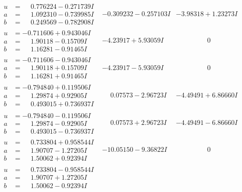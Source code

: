 \documentclass[1p]{elsarticle_modified}
\theoremstyle{definition}
\begin{document}
$$\begin{array}{c|c|c}
\begin{aligned}
u &= \phantom{-}0.776224 - 0.271739 I \\
a &= \phantom{-}1.092310 - 0.739985 I \\
b &= \phantom{-}0.249569 - 0.782908 I\end{aligned}
 & -0.309232 - 0.257103 I & -3.98318 + 1.23273 I \\ \hline\begin{aligned}
u &= -0.711606 + 0.943046 I \\
a &= \phantom{-}1.90118 - 0.15709 I \\
b &= \phantom{-}1.16281 - 0.91465 I\end{aligned}
 & -4.23917 + 5.93059 I & \phantom{-0.000000 } 0 \\ \hline\begin{aligned}
u &= -0.711606 - 0.943046 I \\
a &= \phantom{-}1.90118 + 0.15709 I \\
b &= \phantom{-}1.16281 + 0.91465 I\end{aligned}
 & -4.23917 - 5.93059 I & \phantom{-0.000000 } 0 \\ \hline\begin{aligned}
u &= -0.794840 + 0.119506 I \\
a &= \phantom{-}1.29874 + 0.92905 I \\
b &= \phantom{-}0.493015 + 0.736937 I\end{aligned}
 & \phantom{-}0.07573 - 2.96723 I & -4.49491 + 6.86660 I \\ \hline\begin{aligned}
u &= -0.794840 - 0.119506 I \\
a &= \phantom{-}1.29874 - 0.92905 I \\
b &= \phantom{-}0.493015 - 0.736937 I\end{aligned}
 & \phantom{-}0.07573 + 2.96723 I & -4.49491 - 6.86660 I \\ \hline\begin{aligned}
u &= \phantom{-}0.733804 + 0.958544 I \\
a &= \phantom{-}1.90707 - 1.27205 I \\
b &= \phantom{-}1.50062 + 0.92394 I\end{aligned}
 & -10.05150 - 9.36822 I & \phantom{-0.000000 } 0 \\ \hline\begin{aligned}
u &= \phantom{-}0.733804 - 0.958544 I \\
a &= \phantom{-}1.90707 + 1.27205 I \\
b &= \phantom{-}1.50062 - 0.92394 I\end{aligned}

\end{array}$$
\end{document}

